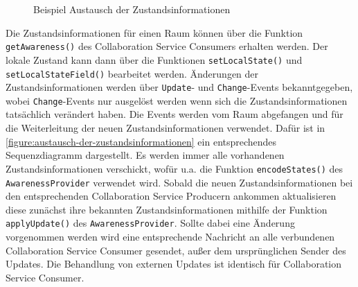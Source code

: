 \begin{figure}[tbp]
    \centering

    \caption{Beispiel Austausch der Zustandsinformationen}
    \label{figure:austausch-der-zustandsinformationen}
\end{figure}

Die Zustandsinformationen für einen Raum können über die Funktion \texttt{getAwareness()} des Collaboration Service Consumers erhalten werden. Der lokale Zustand kann dann über die Funktionen \texttt{setLocalState()} und \texttt{setLocalStateField()} bearbeitet werden. Änderungen der Zustandsinformationen werden über \texttt{Update}- und \texttt{Change}-Events bekanntgegeben, wobei \texttt{Change}-Events nur ausgelöst werden wenn sich die Zustandsinformationen tatsächlich verändert haben. Die Events werden vom Raum abgefangen und für die Weiterleitung der neuen Zustandsinformationen verwendet. Dafür ist in \autoref{figure:austausch-der-zustandsinformationen} ein entsprechendes Sequenzdiagramm dargestellt. Es werden immer alle vorhandenen Zustandsinformationen verschickt, wofür u.a. die Funktion \texttt{encodeStates()} des \texttt{AwarenessProvider} verwendet wird. Sobald die neuen Zustandsinformationen bei den entsprechenden Collaboration Service Producern ankommen aktualisieren diese zunächst ihre bekannten Zustandsinformationen mithilfe der Funktion \texttt{applyUpdate()} des \texttt{AwarenessProvider}. Sollte dabei eine Änderung vorgenommen werden wird eine entsprechende Nachricht an alle verbundenen Collaboration Service Consumer gesendet, außer dem ursprünglichen Sender des Updates. Die Behandlung von externen Updates ist identisch für Collaboration Service Consumer.

